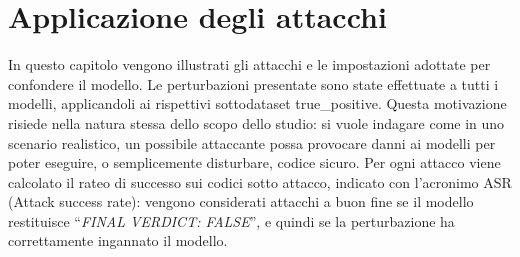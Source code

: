 \chapter{Applicazione degli attacchi}
In questo capitolo vengono illustrati gli attacchi e le impostazioni adottate per confondere il modello.
Le perturbazioni presentate sono state effettuate a tutti i modelli, applicandoli ai rispettivi sottodataset true\_positive. Questa motivazione risiede nella natura stessa dello scopo dello studio: si vuole indagare come in uno scenario realistico, un possibile attaccante possa provocare danni ai modelli per poter eseguire, o semplicemente disturbare, codice sicuro.
Per ogni attacco viene calcolato il rateo di successo sui codici sotto attacco, indicato con l'acronimo ASR (Attack success rate): vengono considerati attacchi a buon fine se il modello restituisce \enquote{\textit{FINAL VERDICT: FALSE}}, e quindi se la perturbazione ha correttamente ingannato il modello.



